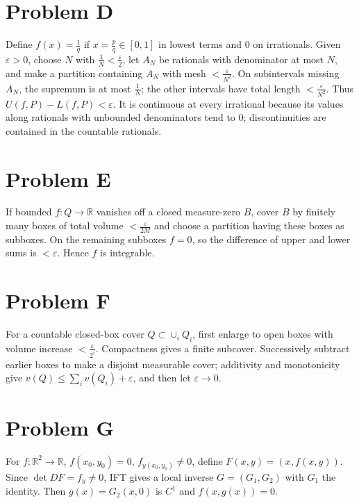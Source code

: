 \section{Problem D}

Define \(f(x) = \frac{1}{q}\) if \(x = \frac{p}{q} \in \left\lbrack {0,1} \right\rbrack\) in lowest terms and \(0\) on irrationals. Given \(\varepsilon > 0\), choose \(N\) with \(\frac{1}{N} < \frac{\varepsilon}{2}\), let \(A_{N}\) be rationals with denominator at most \(N\), and make a partition containing \(A_{N}\) with mesh \(< \frac{\varepsilon}{N^{2}}\). On subintervals missing \(A_{N}\), the supremum is at most \(\frac{1}{N}\); the other intervals have total length \(< \frac{\varepsilon}{N^{2}}\). Thus \(U\left( {f,P} \right) - L\left( {f,P} \right) < \varepsilon\). It is continuous at every irrational because its values along rationals with unbounded denominators tend to \(0\); discontinuities are contained in the countable rationals.

\clearpage

\section{Problem E}

If bounded \(f:Q\rightarrow\mathbb{R}\) vanishes off a closed measure-zero \(B\), cover \(B\) by finitely many boxes of total volume \(< \frac{\varepsilon}{2M}\) and choose a partition having these boxes as subboxes. On the remaining subboxes \(f = 0\), so the difference of upper and lower sums is \(< \varepsilon\). Hence \(f\) is integrable.

\section{Problem F}

For a countable closed-box cover \(Q \subset \cup_{i}Q_{i}\), first enlarge to open boxes with volume increase \(< \frac{\varepsilon}{2^{i}}\). Compactness gives a finite subcover. Successively subtract earlier boxes to make a disjoint measurable cover; additivity and monotonicity give \(v(Q) \leq \sum_{i}v\left( Q_{i} \right) + \varepsilon\), and then let \(\varepsilon\rightarrow 0\).

\section{Problem G}

For \(f:\mathbb{R}^{2}\rightarrow\mathbb{R}\), \(f\left( {x_{0},y_{0}} \right) = 0\), \(f_{y{({x_{0},y_{0}})}} \neq 0\), define \(F\left( {x,y} \right) = \left( {x,f\left( {x,y} \right)} \right)\). Since \(\det DF = f_{y} \neq 0\), IFT gives a local inverse \(G = \left( {G_{1},G_{2}} \right)\) with \(G_{1}\) the identity. Then \(g(x) = G_{2}\left( {x,0} \right)\) is \(C^{1}\) and \(f\left( {x,g(x)} \right) = 0\).

